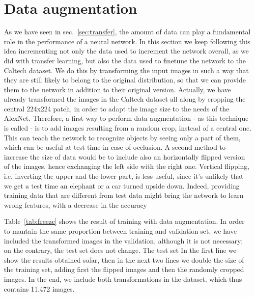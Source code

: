 \documentclass[11pt,twoside,a4paper]{article}
\begin{document}
\section{Data augmentation}
\label{dataAugmen}
As we have seen in sec.~\ref{sec:transfer}, the amount of data can play a fundamental role in the performance of a neural network. In this section we keep following this idea incrementing not only the data used to increment the network overall, as we did with transfer learning, but also the data used to finetune the network to the Caltech dataset. We do this by transforming the input images in such a way that they are still likely to belong to the original distribution, so that we can provide them to the network in addition to their original version.\newline
Actually, we have already transformed the images in the Caltech dataset all along by cropping the central 224x224 patch, in order to adapt the image size to the needs of the AlexNet. Therefore, a first way to perform data augmentation - as this technique is called - is to add images resulting from a random crop, instead of a central one. This can teach the network to recognize objects by seeing only a part of them, which can be useful at test time in case of occlusion.\newline
A second method to increase the size of data would be to include also an horizontally flipped version of the images, hence exchanging the left side with the right one. Vertical flipping, i.e. inverting the upper and the lower part, is less useful, since it's unlikely that we get a test time an elephant or a car turned upside down. Indeed, providing training data that are different from test data might bring the network to learn wrong features, with a decrease in the accuracy

Table~\ref{tab:freeze} shows the result of training with data augmentation. In order to mantain the same proportion between training and validation set, we have included the transformed images in the validation, although it is not necessary; on the contrary, the test set does not change.\newline
The test set In the first line we show the results obtained sofar, then in the next two lines we double the size of the training set, adding first the flipped images and then the randomly cropped images. In the end, we include both transformations in the dataset, which thus contains 11.472 images.
\end{document}
